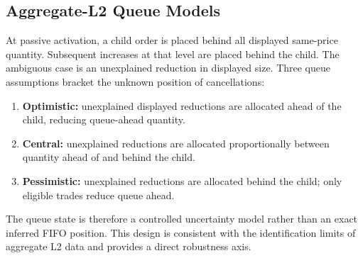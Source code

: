 \documentclass[journal,10pt]{IEEEtran}
\newcommand{\1}{\mathbf{1}}
\begin{document}
\subsection{Aggregate-L2 Queue Models}
\label{sec:queue}
At passive activation, a child order is placed behind all displayed same-price quantity. Subsequent increases at that level are placed behind the child. The ambiguous case is an unexplained reduction in displayed size. Three queue assumptions bracket the unknown position of cancellations:
\begin{enumerate}[leftmargin=*]
    \item \textbf{Optimistic:} unexplained displayed reductions are allocated ahead of the child, reducing queue-ahead quantity.
    \item \textbf{Central:} unexplained reductions are allocated proportionally between quantity ahead of and behind the child.
    \item \textbf{Pessimistic:} unexplained reductions are allocated behind the child; only eligible trades reduce queue ahead.
\end{enumerate}
The queue state is therefore a controlled uncertainty model rather than an exact inferred FIFO position. This design is consistent with the identification limits of aggregate L2 data and provides a direct robustness axis.
\end{document}
